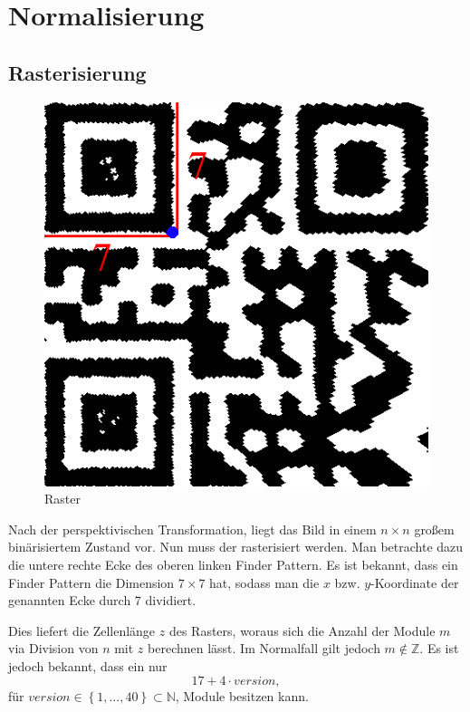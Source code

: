 \chapter{Normalisierung}
\section{Rasterisierung}

\begin{figure}
  \vspace{-20pt}
  \begin{center}
    \includegraphics[scale=0.25]{images/Gitter_step.png}
  \end{center}
  \vspace{-10pt}
  \label{fig:raster-qrcode}\caption{Raster}
  \vspace{-10pt}
\end{figure}

Nach der perspektivischen Transformation, liegt das Bild in einem $n\times n$ großem binärisiertem Zustand vor. Nun muss der \QRCode rasterisiert werden. 
Man betrachte dazu die untere rechte Ecke des oberen linken Finder Pattern. Es ist bekannt, dass ein Finder Pattern die Dimension $7 \times 7$ hat,
sodass man die $x$ bzw. $y$-Koordinate der genannten Ecke durch $7$ dividiert.

Dies liefert die Zellenlänge $z$ des Rasters,
woraus sich die Anzahl der Module $m$ via Division von $n$ mit $z$ berechnen lässt. Im Normalfall gilt jedoch $m \notin \mathbb{Z}$.
Es ist jedoch bekannt, dass ein \QRCode nur 
\begin {equation}
	17 + 4 \cdot version,
\end{equation}
für $version \in \left\{1, ..., 40\right\} \subset \mathbb{N}$, Module besitzen kann.

